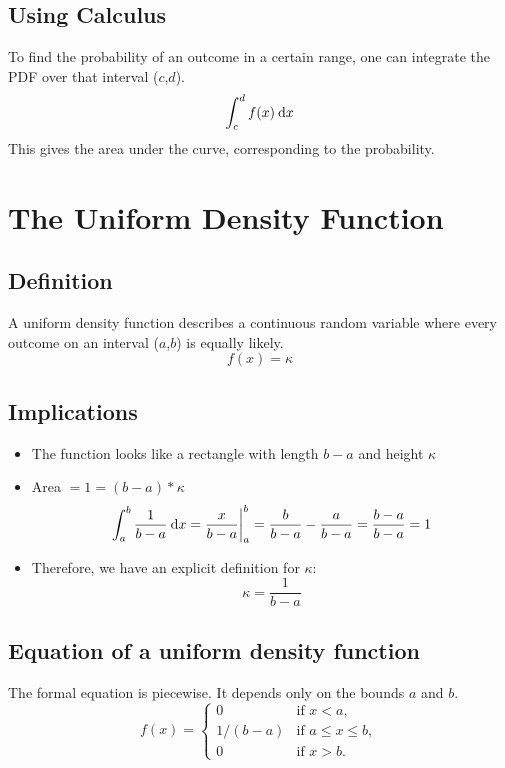\documentclass[12pt,letterpaper]{article}
\begin{document}
\subsection{Using Calculus}
To find the probability of an outcome in a certain range, one can integrate the PDF over that interval ($c$,$d$).
\begin{equation*}
\int_c^d f(x) \:\mathrm{d}x
\end{equation*}
This gives the area under the curve, corresponding to the probability.
\section{The Uniform Density Function}
\subsection{Definition}
A uniform density function describes a continuous random variable where every outcome on an interval ($a$,$b$) is equally likely.
\begin{equation*}
f(x) = \kappa
\end{equation*}
\subsection{Implications}
\begin{itemize}
\item The function looks like a rectangle with length $b-a$ and height $\kappa$
\item Area $= 1 = (b-a)*\kappa$
\begin{equation*}
\int_a^b \frac{1}{b-a} \:\mathrm{d}x = \frac{x}{b-a}\bigg|_a^b = \frac{b}{b-a} - \frac{a}{b-a} = \frac{b-a}{b-a} = 1
\end{equation*}
\item Therefore, we have an explicit definition for $\kappa$:
\begin{equation*}
\kappa = \frac{1}{b-a}
\end{equation*}
\end{itemize}
\subsection{Equation of a uniform density function}
The formal equation is piecewise. It depends only on the bounds $a$ and $b$.
\begin{equation*}
f(x)=
\begin{cases}
0 & \text{if } x < a,\\
1/(b-a) & \text{if } a \leq x \leq b,\\
0 & \text{if } x > b.
\end{cases}
\end{equation*}
\end{document}
